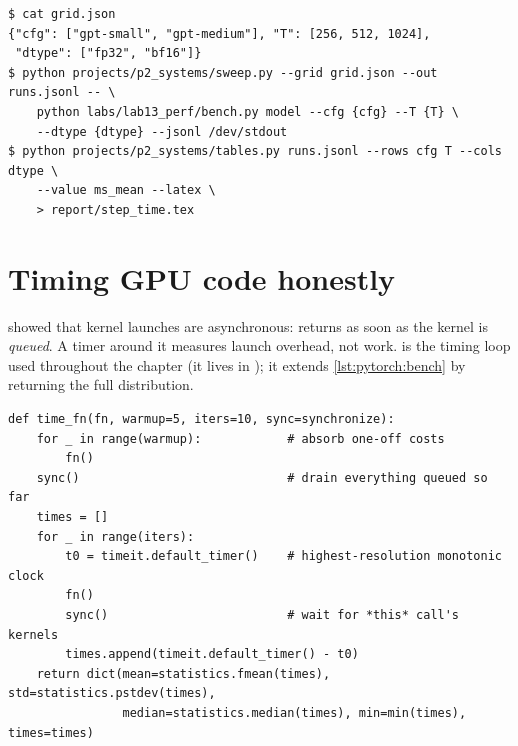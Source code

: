 \begin{lstlisting}[style=shell,caption={A sweep from grid to LaTeX table.},label={lst:perf:sweep}]
$ cat grid.json
{"cfg": ["gpt-small", "gpt-medium"], "T": [256, 512, 1024],
 "dtype": ["fp32", "bf16"]}
$ python projects/p2_systems/sweep.py --grid grid.json --out runs.jsonl -- \
    python labs/lab13_perf/bench.py model --cfg {cfg} --T {T} \
    --dtype {dtype} --jsonl /dev/stdout
$ python projects/p2_systems/tables.py runs.jsonl --rows cfg T --cols dtype \
    --value ms_mean --latex \
    > report/step_time.tex
\end{lstlisting}

\section{Timing GPU code honestly}\label{sec:perf:timing}

 showed that kernel launches are asynchronous: 
returns as soon as the kernel is \emph{queued}. A timer around it measures launch overhead, not
work. \Cref{lst:perf:timefn} is the timing loop used throughout the chapter (it lives in
); it extends \cref{lst:pytorch:bench} by returning the full distribution.

\begin{lstlisting}[caption={Warm up, synchronise, repeat, keep every sample.},label={lst:perf:timefn}]
def time_fn(fn, warmup=5, iters=10, sync=synchronize):
    for _ in range(warmup):            # absorb one-off costs
        fn()
    sync()                             # drain everything queued so far
    times = []
    for _ in range(iters):
        t0 = timeit.default_timer()    # highest-resolution monotonic clock
        fn()
        sync()                         # wait for *this* call's kernels
        times.append(timeit.default_timer() - t0)
    return dict(mean=statistics.fmean(times), std=statistics.pstdev(times),
                median=statistics.median(times), min=min(times), times=times)
\end{lstlisting}

